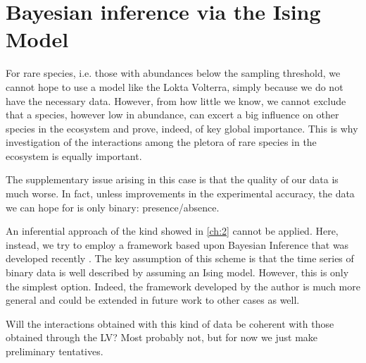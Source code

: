 \chapter{Bayesian inference via the Ising Model}

For rare species, i.e. those with abundances below the sampling threshold, we cannot hope to use a model like the Lokta Volterra, simply because we do not have the necessary data. However, from how little we know, we cannot exclude that a species, however low in abundance, can excert a big influence on other species in the ecosystem and prove, indeed, of key global importance.
This is why investigation of the interactions among the pletora of rare species in the ecosystem is equally important.

The supplementary issue arising in this case is that the quality of our data is much worse. In fact, unless improvements in the experimental accuracy, the data we can hope for is only binary: presence/absence. 

An inferential approach of the kind showed in \ref{ch:2} cannot be applied. Here, instead, we try to employ a framework based upon Bayesian Inference that was developed recently \cite{peixoto_MDL}. The key assumption of this scheme is that the time series of binary data is well described by assuming an Ising model. However, this is only the simplest option. Indeed, the framework developed by the author is much more general and could be extended in future work to other cases as well.

Will the interactions obtained with this kind of data be coherent with those obtained through the LV? Most probably not, but for now we just make preliminary tentatives.

